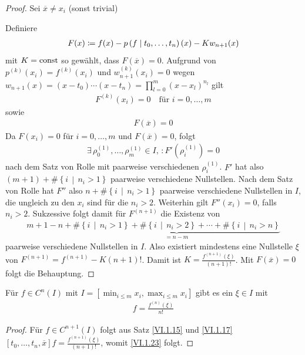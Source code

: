 \begin{proof}
  Sei $\overline{x}\neq x_i$ (sonst trivial)


  Definiere
  \begin{gather}
    F(x) \coloneqq f(x)-p\left( f \mid t_0,\dotsc,t_n \right)(x) - Kw_{n+1}(x)
    \label{VI.1.22}
  \end{gather}
  mit $K=\operatorname{const}$ so gewählt, dass $F(\overline{x})=0$.
  Aufgrund von $p^{(k)}(x_i)=f^{(k)}(x_i)$
  und $w_{n+1}^{(k)}(x_i) = 0$ wegen
  $w_{n+1}(x) =
  (x-t_0)\dotsm(x-t_n)=\prod_{l=0}^{m}(x-x_l)^{n_l}$
  gilt
  \begin{gather*}
    F^{(k)}(x_i) = 0 
    \quad \text{für } i=0,\dotsc,m 
  \end{gather*}
  sowie
  \begin{gather*}
    F(\overline{x})=0
  \end{gather*}
  Da $F(x_i)=0$ für $i=0,\dotsc,m$ und $F(\overline{x})=0$, folgt
  \begin{gather*}
    \exists\, \rho_0^{(1)},\dotsc,\rho_m^{(1)}\in I,\,
    : F'(\rho_i^{(1)})=0
  \end{gather*}
  nach dem Satz von Rolle 
  mit paarweise verschiedenen $\rho_i^{(1)}$.
  $F'$ hat also $(m+1)+\#\left\{i\,\middle\vert\, n_i>1\right\}$
  paarweise verschiedene Nullstellen.
  Nach dem Satz von Rolle hat $F''$ also 
  $n+\#\left\{i\,\middle\vert\, n_i>1\right\}$
  paarweise verschiedene Nullstellen in $I$,
  die ungleich zu den $x_i$ sind für die $n_i>2$.
  Weiterhin gilt $F''(x_i)=0$, falls $n_i>2$.
  Sukzessive folgt damit für $F^{(n+1)}$ die Existenz von
  \begin{gather*}
    m+1-n + \underbrace{
      \#\left\{i\,\middle\vert\, n_i>1\right\}
      + \#\left\{i\,\middle\vert\, n_i>2\right\}
      + \dotsb 
      + \#\left\{i\,\middle\vert\, n_i>n\right\}
    }_{=n-m}
  \end{gather*}
  paarweise verschiedene Nullstellen in $I$.
  Also existiert mindestens eine Nullstelle $\xi$ von
  $F^{(n+1)}=f^{(n+1)}-K(n+1)!$. Damit ist
  $K=\frac{f^{(n+1)}(\xi)}{(n+1)!}$.
  Mit $F(\overline{x}) =0$ folgt die Behauptung.
\end{proof}


\begin{Fole}
  Für $f\in C^n(I) $ mit $I=[\min_{i\leq m}x_i, \max_{i\leq m}x_i]$
  gibt es ein $\xi\in I$ mit 
  \begin{gather}
    [t_0,\dotsc,t_n]f=\frac{f^{(n)}(\xi)}{n!}
    \label{VI.1.23}
  \end{gather}

  \begin{proof}
    Für $f\in C^{n+1}(I)$ folgt aus
    Satz \ref{VI.1.15} und \eqref{VI.1.17}
    $[t_0,\dotsc,t_n,\overline{x}]f= \frac{f^{(n+1)}(\xi)}{(n+1)!}$,
    womit \eqref{VI.1.23} folgt.
  \end{proof}
\end{Fole}

